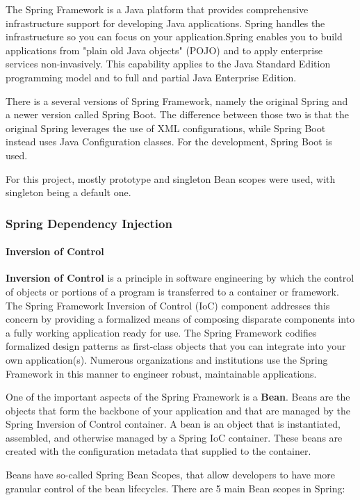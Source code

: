 \documentclass[thesis=M,english,hidelinks]{FITthesis}[2019/12/23]
\begin{document}
The Spring Framework is a Java platform that provides comprehensive infrastructure support for developing Java applications. Spring handles the infrastructure so you can focus on your application.Spring enables you to build applications from "plain old Java objects" (\gls{POJO}) and to apply enterprise services non-invasively. This capability applies to the Java Standard Edition programming model and to full and partial Java Enterprise Edition\cite{spring_ref}.

There is a several versions of Spring Framework, namely the original Spring and a newer version called Spring Boot. The difference between those two is that the original Spring leverages the use of \gls{XML} configurations, while Spring Boot instead uses Java Configuration classes. For the development, Spring Boot is used.

For this project, mostly prototype and singleton Bean scopes were used, with singleton being a default one.

\subsubsection{Spring Dependency Injection}\label{spring}

\paragraph{Inversion of Control}
\textbf{Inversion of Control} is a principle in software engineering by which the control of objects or portions of a program is transferred to a container or framework. The Spring Framework Inversion of Control (IoC) component addresses this concern by providing a formalized means of composing disparate components into a fully working application ready for use. The Spring Framework codifies formalized design patterns as first-class objects that you can integrate into your own application(s). Numerous organizations and institutions use the Spring Framework in this manner to engineer robust, maintainable applications\cite{spring_ref}.

One of the important aspects of the Spring Framework is a \textbf{Bean}. Beans are the objects that form the backbone of your application and that are managed by the Spring Inversion of Control container. A bean is an object that is instantiated, assembled, and otherwise managed by a Spring IoC container. These beans are created with the configuration metadata that supplied to the container.

Beans have so-called Spring Bean Scopes, that allow developers to have more granular control of the bean lifecycles. There are 5 main Bean scopes in Spring:
\end{document}
